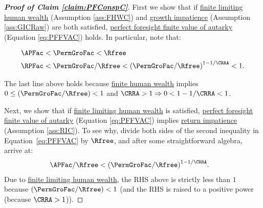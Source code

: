 \documentclass[\econtexRoot/BufferStockTheory]{subfiles}
\begin{document}
\begin{proof}[\textbf{Proof of Claim \ref{claim:PFConspC}}]
First we show that if \hyperlink{FHWC}{finite limiting human wealth} (Assumption \ref{ass:FHWC}) and \hyperlink{GIC}{growth impatience} (Assumption \ref{ass:GICRaw}) are both satisfied, \hyperlink{PFFVAC}{perfect foresight finite value of autarky} (Equation \eqref{eq:PFFVAC}) holds.
In particular, note that:
  
\begin{equation}\label{eq:GICandFHWCimplyPFFVAC}
  \begin{aligned}
    \APFac & < \PermGroFac < \Rfree
    \\   \RPFac & < \PermGroFac/\Rfree < {(\PermGroFac/\Rfree)}^{1-1/\CRRA} < 1.
  \end{aligned}
\end{equation}

The last line above holds because \hyperlink{FHWC}{finite human wealth} implies $0 \leq (\PermGroFac/\Rfree) < 1$ and $\CRRA > 1 \Rightarrow 0 < 1-1/\CRRA < 1$.


Next, we show that if \hyperlink{FHWC}{finite limiting human wealth} is satisfied, \hyperlink{PFFVAC}{perfect foresight finite value of autarky} (Equation \eqref{eq:PFFVAC}) implies \hyperlink{RIC}{return impatience} (Assumption \ref{ass:RIC}).
To see why, divide both sides of the second inequality in Equation~\eqref{eq:PFFVAC} by $\Rfree$, and after some straightforward algebra, arrive at:
%
  \begin{equation}\begin{gathered}\begin{aligned}
    \APFac/\Rfree & < {(\PermGroFac/\Rfree)}^{1-1/\CRRA}  \label{eq:FHWCandPFFVACimplyRIC}.
  \end{aligned}\end{gathered}\end{equation}
  Due to \hyperlink{FHWC}{finite limiting human wealth}, the RHS above is strictly less than $ 1$ because $(\PermGroFac/\Rfree) < 1$ (and the RHS is raised to a positive power (because $\CRRA>1$)).

\end{proof}
%
\begin{comment}
The first panel of Table~\ref{table:Required} summarizes: The PF-Unconstrained model has a non-degenerate limiting solution if we impose the {\RIC} and {\FHWC} (these conditions are necessary as well as sufficient).
Together the {\PFFVAC} and the {\FHWC} imply the {\RIC}.
If we impose the {\GICRaw} and the {\FHWC}, both the {\PFFVAC} and the {\RIC} follow, so {\GICRaw}+{\FHWC} are also sufficient.
But there are circumstances under which the {\RIC} and {\FHWC} can hold while the {\PFFVAC} fails (`\cncl{\PFFVAC}').
For example, if $\PermGroFac=0$, the problem is a standard `cake-eating' problem with a non-degenerate solution under the {\RIC} (when the consumer has access to capital markets).%
\end{comment}
\end{document}

